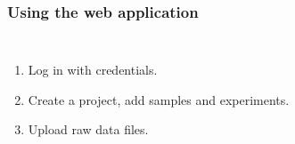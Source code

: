 \documentclass{beamer}
\begin{document}
	\begin{frame}[t]
		\frametitle{Using the web application}
		
		\begin{columns}[T,onlytextwidth]
			\begin{enumerate}
				\item Log in with credentials.
				\item Create a project, add samples and experiments.
				\item Upload raw data files.
			\end{enumerate}
			
			\centering
			\vspace{-1.6em}
		\end{columns}
		
		\newlength{\bottomimgheight}
		\setlength{\bottomimgheight}{0.36\paperheight}
		\vspace*{\bottomimgheight}
		

\end{frame}
\end{document}
